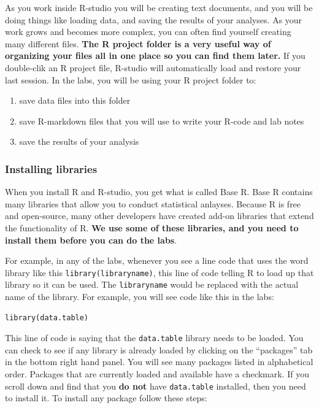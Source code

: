 \documentclass[
]{book}
\providecommand{\tightlist}{%
  \setlength{\itemsep}{0pt}\setlength{\parskip}{0pt}}
\begin{document}
As you work inside R-studio you will be creating text documents, and you will be doing things like loading data, and saving the results of your analyses. As your work grows and becomes more complex, you can often find yourself creating many different files. \textbf{The R project folder is a very useful way of organizing your files all in one place so you can find them later.} If you double-clik an R project file, R-studio will automatically load and restore your last session. In the labs, you will be using your R project folder to:

\begin{enumerate}
\def\labelenumi{\arabic{enumi}.}
\tightlist
\item
  save data files into this folder
\item
  save R-markdown files that you will use to write your R-code and lab notes
\item
  save the results of your analysis
\end{enumerate}

\hypertarget{installing-libraries}{%
\subsubsection{Installing libraries}\label{installing-libraries}}

When you install R and R-studio, you get what is called Base R. Base R contains many libraries that allow you to conduct statistical anlayses. Because R is free and open-source, many other developers have created add-on libraries that extend the functionality of R. \textbf{We use some of these libraries, and you need to install them before you can do the labs}.

For example, in any of the labs, whenever you see a line code that uses the word library like this \texttt{library(libraryname)}, this line of code telling R to load up that library so it can be used. The \texttt{libraryname} would be replaced with the actual name of the library. For example, you will see code like this in the labs:

\begin{verbatim}
library(data.table)
\end{verbatim}

This line of code is saying that the \texttt{data.table} library needs to be loaded. You can check to see if any library is already loaded by clicking on the ``packages'' tab in the bottom right hand panel. You will see many packages listed in alphabetical order. Packages that are currently loaded and available have a checkmark. If you scroll down and find that you \textbf{do not} have \texttt{data.table} installed, then you need to install it. To install any package follow these steps:
\end{document}
